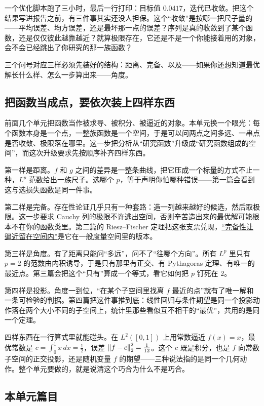 一个优化脚本跑了三小时，最后一行打印：目标值 \(0.0417\)，迭代已收敛。把这个结果写进报告之前，有三件事其实还没人担保。这个``收敛''是按哪一把尺子量的——平均误差、均方误差，还是最坏那一点的误差？序列是真的收敛到了某个函数，还是仅仅彼此越靠越近？就算极限存在，它还是不是一个你能接着用的对象，会不会已经跳出了你研究的那一族函数？

三个问号对应三样必须先装好的结构：距离、完备、以及——如果你还想知道最优解长什么样、怎么一步算出来——角度。

\subsection{把函数当成点，要依次装上四样东西}

前面几个单元把函数当作被求导、被积分、被逼近的对象。本单元换一个眼光：每个函数本身是一个点，一整族函数是一个空间，于是可以问两点之间多远、一串点是否收敛、极限落在哪里。这一步把分析从``研究函数''升级成``研究函数组成的空间''，而这次升级要求先按顺序补齐四样东西。

第一样是距离。\(f\) 和 \(g\) 之间的差异是一整条曲线，把它压成一个标量的方式不止一种，\(L^p\) 范数给出一族尺子。选哪个 \(p\)，等于声明你怕哪种错误——第一篇会看到这与选损失函数是同一件事。

第二样是完备。存在性论证几乎只有一种套路：造一列越来越好的候选，然后取极限。这一步要求 Cauchy 列的极限不许逃出空间，否则辛苦造出来的最优解可能根本不在你的函数类里。第二篇的 Riesz--Fischer 定理把这张支票兑现，\hyperref[sec:12-Real-Analysis-Support/03-Topology-Basics/03]{``完备性让逼近留在空间内''}是它在一般度量空间里的版本。

第三样是角度。有了距离只能问``多远''，问不了``往哪个方向''。所有 \(L^p\) 里只有 \(p=2\) 的范数由内积诱导，于是只有那里有正交、有 Pythagoras 定理、有唯一的最近点。第三篇会把这个``只有''算成一个等式，看它如何把 \(p\) 钉死在 \(2\)。

第四样是投影。角度一到位，``在某个子空间里找离 \(f\) 最近的点''就有了唯一解和一条可检验的判据。第四篇把这件事推到底：线性回归与条件期望是同一个投影动作落在两个大小不同的子空间上，统计里那些看似互不相干的``最优''，共用的是同一个定理。

四样东西在一行算式里就能碰头。在 \(L^2([0,1])\) 上用常数逼近 \(f(x)=x\)，最优常数是 \(c=\int_0^1x\,dx=\tfrac12\)，误差 \(\left\lVert f-c\right\rVert_2^2=\tfrac1{12}\)。这个 \(c\) 既是积分，也是 \(f\) 向常数子空间的正交投影，还是随机变量 \(f\) 的期望——三种说法指的是同一个几何动作。整个单元要做的，就是说清这个巧合为什么不是巧合。

\subsection{本单元篇目}

